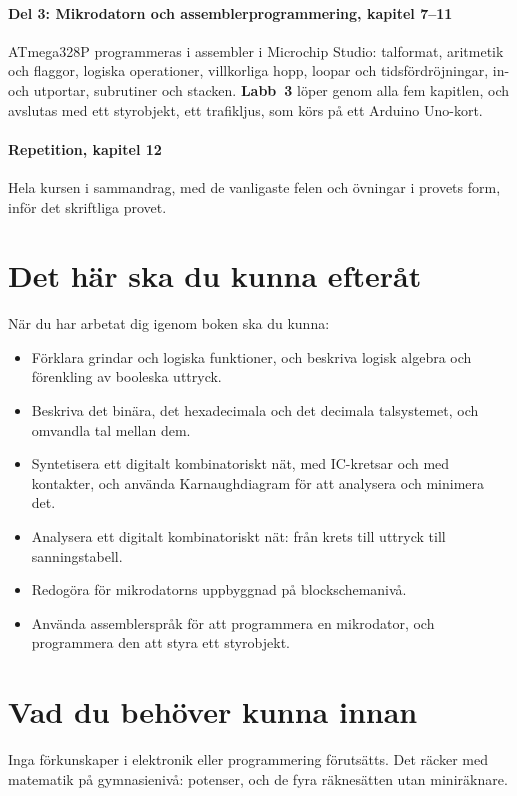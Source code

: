 \paragraph{Del 3: Mikrodatorn och assemblerprogrammering, kapitel 7--11} ATmega328P programmeras i
assembler i Microchip Studio: talformat, aritmetik och flaggor, logiska operationer, villkorliga
hopp, loopar och tidsfördröjningar, in- och utportar, subrutiner och stacken. \textbf{Labb~3} löper
genom alla fem kapitlen, och avslutas med ett styrobjekt, ett trafikljus, som körs på ett Arduino
Uno-kort.

\paragraph{Repetition, kapitel 12} Hela kursen i sammandrag, med de vanligaste felen och övningar
i provets form, inför det skriftliga provet.

\section*{Det här ska du kunna efteråt}
När du har arbetat dig igenom boken ska du kunna:
\begin{itemize}
  \item Förklara grindar och logiska funktioner, och beskriva logisk algebra och förenkling av
    booleska uttryck.
  \item Beskriva det binära, det hexadecimala och det decimala talsystemet, och omvandla tal
    mellan dem.
  \item Syntetisera ett digitalt kombinatoriskt nät, med IC-kretsar och med kontakter, och använda
    Karnaughdiagram för att analysera och minimera det.
  \item Analysera ett digitalt kombinatoriskt nät: från krets till uttryck till sanningstabell.
  \item Redogöra för mikrodatorns uppbyggnad på blockschemanivå.
  \item Använda assemblerspråk för att programmera en mikrodator, och programmera den att styra ett
    styrobjekt.
\end{itemize}

\section*{Vad du behöver kunna innan}
Inga förkunskaper i elektronik eller programmering förutsätts. Det räcker med matematik på
gymnasienivå: potenser, och de fyra räknesätten utan miniräknare.

